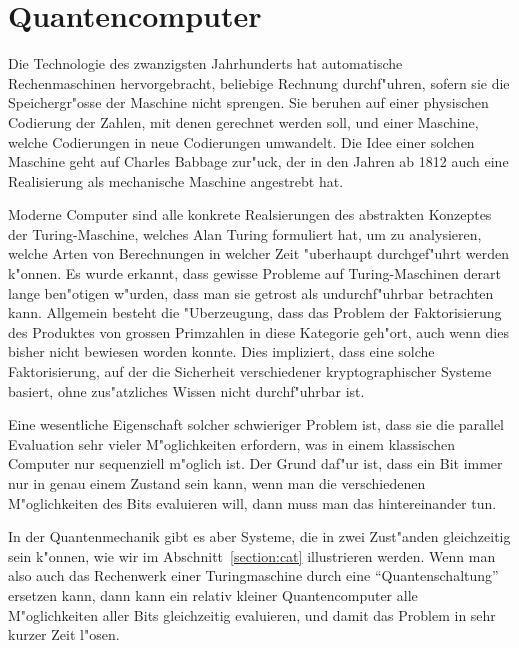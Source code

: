 \chapter{Quantencomputer\label{chapter:quantencomputer}}
\rhead{}
Die Technologie des zwanzigsten Jahrhunderts hat automatische
Rechenmaschinen hervorgebracht, beliebige Rechnung durchf"uhren,
sofern sie die Speichergr"osse der Maschine nicht sprengen.
Sie beruhen auf einer physischen Codierung der Zahlen, mit denen
gerechnet werden soll, und einer Maschine, welche Codierungen 
in neue Codierungen umwandelt.
Die Idee einer solchen Maschine geht auf Charles Babbage zur"uck,
der in den Jahren ab 1812 auch eine Realisierung als mechanische
Maschine angestrebt hat.

Moderne Computer sind alle konkrete Realsierungen des abstrakten
Konzeptes der Turing-Ma\-schi\-ne, welches Alan Turing formuliert hat,
um zu analysieren, welche Arten von Berechnungen in welcher Zeit
"uberhaupt durchgef"uhrt werden k"onnen.
Es wurde erkannt, dass gewisse Probleme auf Turing-Maschinen
derart lange ben"otigen w"urden, dass man sie getrost als undurchf"uhrbar
betrachten kann.
Allgemein besteht die "Uberzeugung, dass das Problem der Faktorisierung
des Produktes von grossen Primzahlen in diese Kategorie geh"ort,
auch wenn dies bisher nicht bewiesen worden konnte.
Dies impliziert, dass eine solche Faktorisierung, auf der die Sicherheit
verschiedener kryptographischer Systeme basiert, ohne zus"atzliches
Wissen nicht durchf"uhrbar ist.

Eine wesentliche Eigenschaft solcher schwieriger Problem ist, dass
sie die parallel Evaluation sehr vieler M"oglichkeiten erfordern,
was in einem klassischen Computer nur sequenziell m"oglich ist.
Der Grund daf"ur ist, dass ein Bit immer nur in genau einem
Zustand sein kann, wenn man die verschiedenen M"oglichkeiten des
Bits evaluieren will, dann muss man das hintereinander tun.

In der Quantenmechanik gibt es aber Systeme, die in zwei Zust"anden
gleichzeitig sein k"onnen, wie wir im Abschnitt~\ref{section:cat}
illustrieren werden.
Wenn man also auch das Rechenwerk einer Turingmaschine durch eine
``Quantenschaltung'' ersetzen kann, dann kann ein relativ kleiner
Quantencomputer alle M"oglichkeiten aller Bits gleichzeitig evaluieren,
und damit das Problem in sehr kurzer Zeit l"osen.

